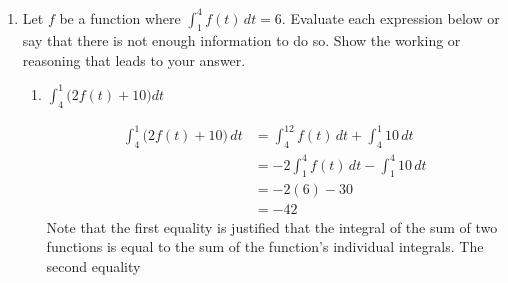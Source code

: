 \documentclass{article}
\begin{document}
\begin{enumerate}
\begin{enumerate}
    \newcommand{\blank}{\quad\underline{\hspace{2cm}}\quad}

\probonly{
    \[\hss
    \blank< \blank < \blank < \blank < \blank
    \hss\]
}

\begin{solution}
    The lefthand approximations are all underestimates. The righthand approximations are all overestimates. Increasing the number of intervals will improve the approximation and bring it closer to the actual value of the definite integral. This gives us:
    \[
    L_8 < L_{80} < \int_0^8 v(t) dt<R_{80} < R_8
    \]
\end{solution}
    \end{enumerate}


\pspace{\newpage}

    \item %
    Let $f$ be a function where $\displaystyle \int_1^4f(t)\,dt= 6$. Evaluate each expression below or say that there is not enough information to do so. Show the working or reasoning that leads to your answer.
    \begin{enumerate}
        
        
        \item 
        \begin{problem}
        $\displaystyle \int_4^1 \big(2f(t)+10\big)dt$
        \end{problem}
        \pspace{\vfill}

        \begin{solution}
           \begin{align*}
           \int_4^1 \big(2f(t)+10\big)\,dt & =\int_4^12 f(t)\,dt + \int_4^1 10\,dt \\
           &= -2\int_1^4f(t)\,dt - \int_1^4 10\,dt \\
           &= -2(6)-30 \\ &= \boxed{-42}
           \end{align*}
           Note that the first equality is justified that the integral of the sum of two functions is equal to the sum of the function's individual integrals. The second equality
           

\end{solution}
\end{enumerate}
\end{enumerate}
\end{document}

